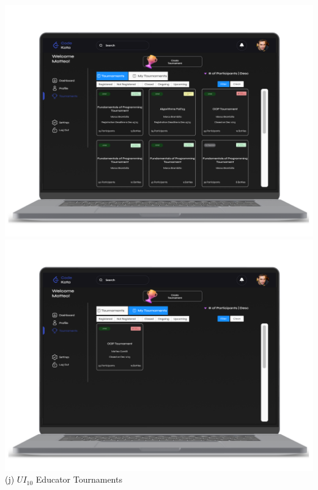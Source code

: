 \begin{center}
\includegraphics[scale=0.13]{Images/ui-ux/educator_tournaments_1.png}
\includegraphics[scale=0.13]{Images/ui-ux/educator_tournaments_2.png}
        (j) $UI_{10}$  Educator Tournaments
\end{center}
